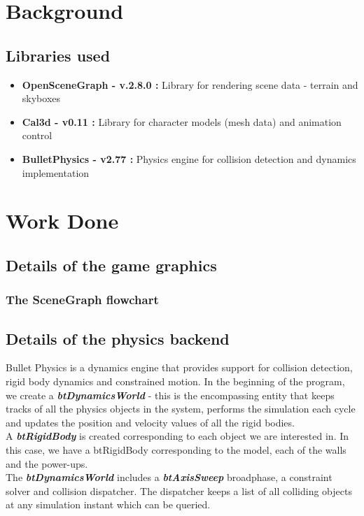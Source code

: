 \documentclass[a4paper]{article}
\newcommand{\emp}[1]{\textbf{\emph{#1}}}
\begin{document}
\section{\color{db}Background}
\subsection{\color{db}Libraries used}
\begin{itemize}
\item \textbf{OpenSceneGraph - v.2.8.0 : } Library for rendering scene data - terrain and skyboxes 
\item \textbf{Cal3d - v0.11 : } Library for character models (mesh data) and animation control
\item \textbf{BulletPhysics - v2.77 : } Physics engine for collision detection and dynamics implementation
\end{itemize}




\section{\color{db}Work Done}
\subsection{\color{db}Details of the game graphics}
\subsubsection{\color{db}The SceneGraph flowchart}

\subsection{\color{db}Details of the physics backend}
Bullet Physics is a dynamics engine that provides support for collision detection, rigid body dynamics and constrained motion. In the beginning of the program, we create a \emp{btDynamicsWorld} - this is the encompassing entity that keeps tracks of all the physics objects in the system, performs the simulation each cycle and updates the position and velocity values of all the rigid bodies. \\
A \emp{btRigidBody} is created corresponding to each object we are interested in. In this case, we have a btRigidBody corresponding to the model, each of the walls and the power-ups.  \\
The \emp{btDynamicsWorld} includes a \emp{btAxisSweep} broadphase, a constraint solver and collision dispatcher. The dispatcher keeps a list of all colliding objects at any simulation instant which can be queried.
\end{document}
